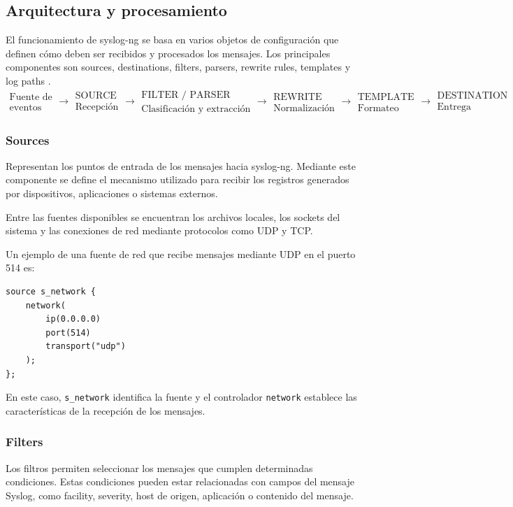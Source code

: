 \subsection{Arquitectura y procesamiento}
El funcionamiento de syslog-ng se basa en varios objetos de configuración que definen cómo deben ser recibidos y procesados los mensajes. Los principales componentes son sources, destinations, filters, parsers, rewrite rules, templates y log paths \cite{syslogng_documentation}.
\begin{equation}
\boxed{
\substack{\text{Fuente de}\\\text{eventos}}
\rightarrow
\substack{\text{SOURCE}\\\text{Recepción}}
\rightarrow
\substack{\text{FILTER / PARSER}\\\text{Clasificación y extracción}}
\rightarrow
\substack{\text{REWRITE}\\\text{Normalización}}
\rightarrow
\substack{\text{TEMPLATE}\\\text{Formateo}}
\rightarrow
\substack{\text{DESTINATION}\\\text{Entrega}}
}
\label{eq:flujo-syslog-ng}
\end{equation}

\subsubsection{Sources}
Representan los puntos de entrada de los mensajes
hacia syslog-ng. Mediante este componente se define el mecanismo utilizado para recibir los registros generados por dispositivos, aplicaciones o sistemas externos.

Entre las fuentes disponibles se encuentran los archivos locales, los
sockets del sistema y las conexiones de red mediante protocolos como UDP y TCP.

Un ejemplo de una fuente de red que recibe mensajes mediante UDP en el
puerto 514 es:

\begin{lstlisting}[style=logstyle]
source s_network {
    network(
        ip(0.0.0.0)
        port(514)
        transport("udp")
    );
};
\end{lstlisting}

En este caso, \texttt{s\_network} identifica la fuente y el controlador
\texttt{network} establece las características de la recepción de los
mensajes.

\subsubsection{Filters}
Los filtros permiten seleccionar los mensajes que cumplen determinadas condiciones. Estas condiciones pueden estar relacionadas con campos del mensaje Syslog, como facility, severity, host de origen, aplicación o contenido del mensaje.

